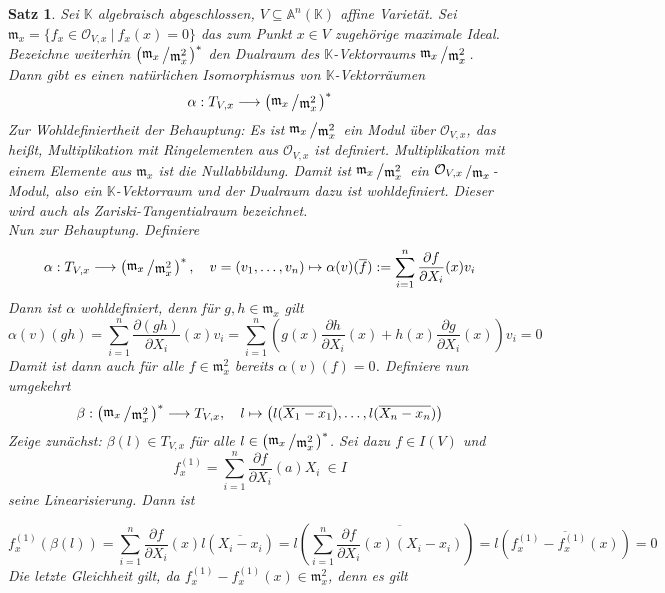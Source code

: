 \documentclass[11pt]{book}
\newtheorem{theorem}{Satz}[section]
\theoremstyle{nonumberbreak}
\newenvironment{pr}[1][]{\ifthenelse{\equal{#1}{}}{\proof}{\proof[#1]}\rm}{\endproof}
\newcommand{\slant}[2]{{\raisebox{.1em}{$#1$}\left/\raisebox{-.1em}{$#2$}\right.}}
\begin{document}
\begin{spacing}{1.3}
\begin{theorem}
Sei $\mathbb{K}$ algebraisch abgeschlossen, $V \subseteq \mathbb{A}^n(\mathbb{K})$ affine Varietät. Sei $\mathfrak{m}_x=\{ f_x \in \mathcal{O}_{V,x} \ \vert \ f_x(x)=0 \}$ das zum Punkt $x \in V$ zugehörige maximale Ideal. Bezeichne weiterhin 
$\left( \slant{\mathfrak{m}_x}{\mathfrak{m}_x^2}\right)^{*}$
den Dualraum des $\mathbb{K}$-Vektorraums $\slant{\mathfrak{m}_x}{\mathfrak{m}_x^2}$. Dann gibt es einen natürlichen Isomorphismus von $\mathbb{K}$-Vektorräumen 
$$\alpha: T_{V,x} \longrightarrow \left( \slant{\mathfrak{m}_x}{\mathfrak{m}_x^2} \right)^{*}$$
\begin{pr}
Zur Wohldefiniertheit der Behauptung: Es ist $\slant{\mathfrak{m}_x}{\mathfrak{m}_x^2}$ ein Modul über $\mathcal{O}_{V,x}$, das heißt, Multiplikation mit Ringelementen aus $\mathcal{O}_{V,x}$ ist definiert. Multiplikation mit einem Elemente aus $\mathfrak{m}_x$ ist die Nullabbildung. Damit ist $\slant{\mathfrak{m}_x}{\mathfrak{m}_x^2}$ ein $\slant{\mathcal{O}_{V,x}}{\mathfrak{m}_x}$-Modul, also ein $\mathbb{K}$-Vektorraum und der Dualraum dazu ist wohldefiniert. Dieser wird auch als \textit{Zariski-Tangentialraum} bezeichnet. \\
Nun zur Behauptung. Definiere 
$$\alpha: T_{V,x} \longrightarrow \left( \slant{\mathfrak{m}_x}{\mathfrak{m}_x^2}\right)^{*}, \quad v=(v_1, \ldots, v_n) \mapsto \alpha(v)(\overline{f}):= \sum_{i=1}^n \frac{\partial f}{\partial X_i} (x) v_i$$
Dann ist $\alpha$ wohldefiniert, denn für $g,h \in \mathfrak{m}_x$ gilt
$$\alpha(v)(gh) = \sum_{i=1}^n \frac{\partial (gh)}{\partial X_i} (x) v_i = \sum_{i=1}^n \left( g(x) \frac{\partial h}{\partial X_i} (x) + h(x) \frac{\partial g}{\partial X_i}(x) \right) v_i =0$$
Damit ist dann auch für alle $f \in \mathfrak{m}_x^2$ bereits $\alpha(v)(f)=0$.  Definiere nun umgekehrt
$$\beta: \left( \slant{\mathfrak{m}_x}{\mathfrak{m}_x^2}\right) ^{*} \longrightarrow T_{V,x}, \quad l \mapsto \left(l (\overline{X_1-x_1}), \ldots, l (\overline{X_n-x_n}) \right)$$
Zeige zunächst: $\beta(l) \in T_{V,x}$ für alle $l \in \left(\slant{\mathfrak{m}_x}{\mathfrak{m}_x^2}\right)^{*}$. Sei dazu $f \in I(V)$ und
$$f_x^{(1)} = \sum_{i=1}^n \frac{\partial f }{\partial X_i} (a) X_i \ \in I$$
seine Linearisierung. Dann ist 

$$f_x^{(1)} \left(\beta(l)\right) = \sum_{i=1}^n \frac{\partial f}{\partial X_i} (x) l\left(\overline{X_i-x_i} \right) = l\left( \sum_{i=1}^n \overline{\frac{\partial f}{\partial X_i} (x) (X_i-x_i)} \right) = l \left( \overline{f_x^{(1)}- f_x^{(1)}(x)} \right) = 0$$
Die letzte Gleichheit gilt, da $f_x^{(1)} - f_x^{(1)} (x) \in \mathfrak{m}_x^2$, denn es gilt


\end{pr}
\end{theorem}
\end{spacing}
\end{document}
